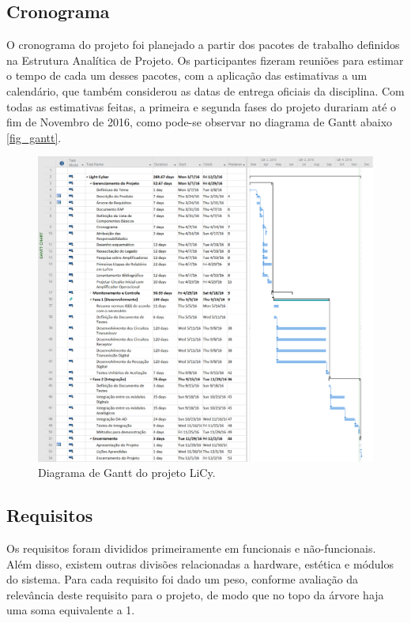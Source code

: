	\subsection{Cronograma}\label{subsec-cronograma}
	
	O cronograma do projeto foi planejado a partir dos pacotes de trabalho definidos na Estrutura Analítica de Projeto. Os participantes fizeram reuniões para estimar o tempo de cada um desses pacotes, com a aplicação das estimativas a um calendário, que também considerou as datas de entrega oficiais da disciplina. Com todas as estimativas feitas, a primeira e segunda fases do projeto durariam até o fim de Novembro de 2016, como pode-se observar no diagrama de Gantt abaixo \autoref{fig_gantt}.  
	
	\begin{figure}[h!]
		\caption{\label{fig_gantt}Diagrama de Gantt do projeto LiCy.}
		\centering
		\includegraphics[width=1.0\textwidth]{gantt.png}
	\end{figure}
	
	\subsection{Requisitos}\label{subsec-requisitos}
	
	Os requisitos foram divididos primeiramente em funcionais e não-funcionais. Além disso, existem outras divisões relacionadas a hardware, estética e módulos do sistema. Para cada requisito foi dado um peso, conforme avaliação da relevância deste requisito para o projeto, de modo que no topo da árvore haja uma soma equivalente a 1.
	
